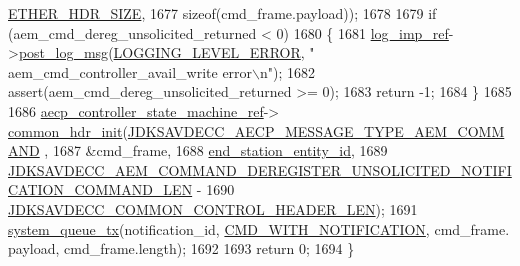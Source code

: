 \begin{DoxyCode}
      \hyperlink{namespaceavdecc__lib_a6c827b1a0d973e18119c5e3da518e65ca9512ad9b34302ba7048d88197e0a2dc0}{ETHER\_HDR\_SIZE},
1677                                                                                                           \textcolor{keyword}{
      sizeof}(cmd\_frame.payload));
1678 
1679     \textcolor{keywordflow}{if} (aem\_cmd\_dereg\_unsolicited\_returned < 0)
1680     \{
1681         \hyperlink{namespaceavdecc__lib_acbe3e2a96ae6524943ca532c87a28529}{log\_imp\_ref}->\hyperlink{classavdecc__lib_1_1log_a68139a6297697e4ccebf36ccfd02e44a}{post\_log\_msg}(\hyperlink{namespaceavdecc__lib_a501055c431e6872ef46f252ad13f85cdaf2c4481208273451a6f5c7bb9770ec8a}{LOGGING\_LEVEL\_ERROR}, \textcolor{stringliteral}{"
      aem\_cmd\_controller\_avail\_write error\(\backslash\)n"});
1682         assert(aem\_cmd\_dereg\_unsolicited\_returned >= 0);
1683         \textcolor{keywordflow}{return} -1;
1684     \}
1685 
1686     \hyperlink{namespaceavdecc__lib_a0b1b5aea3c0490f77cbfd9178af5be22}{aecp\_controller\_state\_machine\_ref}->
      \hyperlink{classavdecc__lib_1_1aecp__controller__state__machine_aafc737d7ed17a62fed9df6528f18d3ec}{common\_hdr\_init}(\hyperlink{group__aecp__message__type_ga4625ce189cc209f42deb0629f48faf69}{JDKSAVDECC\_AECP\_MESSAGE\_TYPE\_AEM\_COMMAND}
      ,
1687                                                        &cmd\_frame,
1688                                                        \hyperlink{classavdecc__lib_1_1end__station__imp_ac32ac278fb799e1b4f0cd539e0abe2b5}{end\_station\_entity\_id},
1689                                                        
      \hyperlink{group__command__deregister__unsolicited__notification_ga09edf0f352ed57aaf985b0426a11f09a}{JDKSAVDECC\_AEM\_COMMAND\_DEREGISTER\_UNSOLICITED\_NOTIFICATION\_COMMAND\_LEN}
       -
1690                                                            
      \hyperlink{group__jdksavdecc__avtp__common__control__header_gaae84052886fb1bb42f3bc5f85b741dff}{JDKSAVDECC\_COMMON\_CONTROL\_HEADER\_LEN});
1691     \hyperlink{namespaceavdecc__lib_a6dd511685627c0865a3442b539a4e8e9}{system\_queue\_tx}(notification\_id, \hyperlink{namespaceavdecc__lib_aabcadff06aa62be0ce47bc0646823604aba48b8a017e06fb240b650cdea965178}{CMD\_WITH\_NOTIFICATION}, cmd\_frame.
      payload, cmd\_frame.length);
1692 
1693     \textcolor{keywordflow}{return} 0;
1694 \}
\end{DoxyCode}


